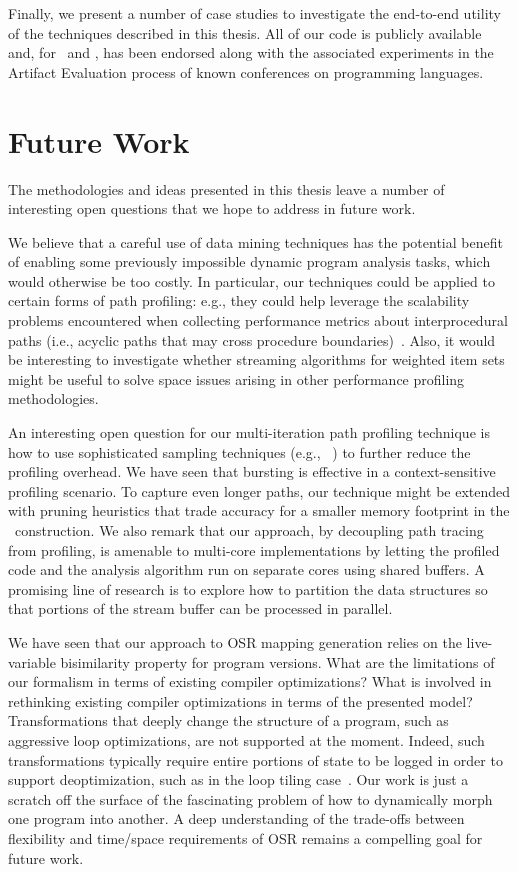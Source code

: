 Finally, we present a number of case studies to investigate the end-to-end utility of the techniques described in this thesis. All of our code is publicly available and, for \kblpp\ and \osrkit, has been endorsed along with the associated experiments in the Artifact Evaluation process of known conferences on programming languages.

\section*{Future Work}
The methodologies and ideas presented in this thesis leave a number of interesting open questions that we hope to address in future work.

We believe that a careful use of data mining techniques has the potential benefit of enabling some previously impossible dynamic program analysis tasks, which would otherwise be too costly. In particular, our techniques could be applied to certain forms of path profiling: e.g., they could help leverage the scalability problems encountered when collecting performance metrics about interprocedural paths (i.e., acyclic paths that may cross procedure boundaries)~\cite{Melski99}. Also, it would be interesting to investigate whether streaming algorithms for weighted item sets might be useful to solve space issues arising in other performance profiling methodologies.

An interesting open question for our multi-iteration path profiling technique is how to use sophisticated sampling techniques (e.g., ~\cite{Arnold01,Zhuang06}) to further reduce the profiling overhead. We have seen that bursting is effective in a context-sensitive profiling scenario. To capture even longer paths, our technique might be extended with pruning heuristics that trade accuracy for a smaller memory footprint in the \ksf\ construction. We also remark that our approach, by decoupling path tracing from profiling, is amenable to multi-core implementations by letting the profiled code and the analysis algorithm run on separate cores using shared buffers. A promising line of research is to explore how to partition the data structures so that portions of the stream buffer can be processed in parallel.

We have seen that our approach to OSR mapping generation relies on the live-variable bisimilarity property for program versions. What are the limitations of our formalism in terms of existing compiler optimizations? What is involved in rethinking existing compiler optimizations in terms of the presented model? Transformations that deeply change the structure of a program, such as aggressive loop optimizations, are not supported at the moment. Indeed, such transformations typically require entire portions of state to be logged in order to support deoptimization, such as in the loop tiling case~\cite{Bhandari15}. Our work is just a scratch off the surface of the fascinating problem of how to dynamically morph one program into another. A deep understanding of the trade-offs between flexibility and time/space requirements of OSR remains a compelling goal for future work.

